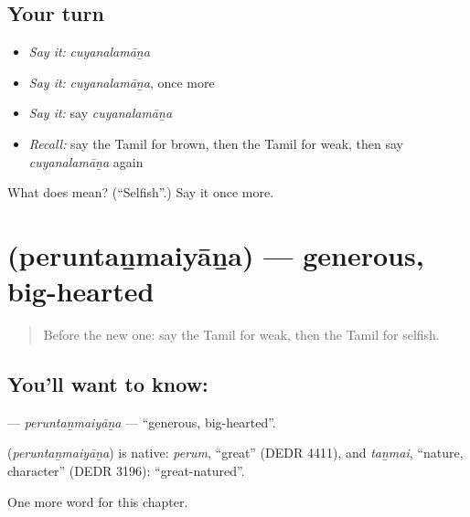 \subsection*{Your turn}
\begin{itemize}
\raggedright
  \item \emph{Say it:} \emph{cuyanalamāṉa}
  \item \emph{Say it:} \emph{cuyanalamāṉa}, once more
  \item \emph{Say it:} say \emph{cuyanalamāṉa}
  \item \emph{Recall:} say the Tamil for brown, then the Tamil for weak, then say \emph{cuyanalamāṉa} again
\end{itemize}

\begin{tcolorbox}[breakable,colback=teal!4,colframe=teal!35!black,title={Before you move on}]
What does  mean? (\textquotedblleft{}Selfish\textquotedblright{}.) Say it once more.
\end{tcolorbox}
\section[\texorpdfstring{\ta{பெருந்தன்மையான} (peruntaṉmaiyāṉa)}{பெருந்தன்மையான (peruntaṉmaiyāṉa)}]{ (peruntaṉmaiyāṉa) — generous, big-hearted}

\label{lesson:TA-C212-peruntanmaiyana}



\begin{quote}
Before the new one: say the Tamil for weak, then the Tamil for selfish.
\end{quote}

\subsection*{You'll want to know: }
\textbf{} — \emph{peruntaṉmaiyāṉa} — \textquotedblleft{}generous, big-hearted\textquotedblright{}.

\begin{cousinweb}
\textbf{} (\emph{peruntaṉmaiyāṉa}) is native: \emph{perum}, \textquotedblleft{}great\textquotedblright{} (DEDR 4411), and \emph{taṉmai}, \textquotedblleft{}nature, character\textquotedblright{} (DEDR 3196): \textquotedblleft{}great-natured\textquotedblright{}.
\end{cousinweb}

\begin{grammarlens}[title={What you've built}]
One more word for this chapter.
\end{grammarlens}

